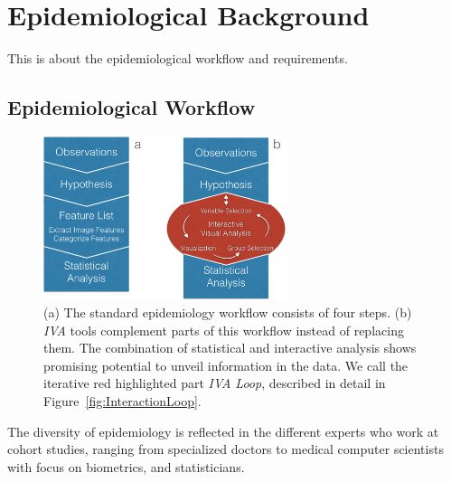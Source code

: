 \documentclass[journal]{style/vgtc} 			          %
\begin{document}
\section{Epidemiological Background} \label{MedicalAndTechnicalBackground}

This is about the epidemiological workflow and requirements.

\subsection{Epidemiological Workflow} \label{EpidemiologicalWorkflow}
\begin{figure}[htb]
 \centering
 \includegraphics[width=2.8in]{figures/workflow_comparison}
 \caption{
 (a) The standard epidemiology workflow consists of four steps.
 (b) \emph{IVA} tools complement parts of this workflow instead of replacing them.
 The combination of statistical and interactive analysis shows promising potential to unveil information in the data.
 We call the iterative red highlighted part \emph{IVA Loop}, described in detail in Figure~\ref{fig:InteractionLoop}.
 }
  \label{fig:WorkflowComparison}
\end{figure}
The diversity of epidemiology is reflected in the different experts who work at cohort studies, ranging from specialized doctors to medical computer scientists with focus on biometrics, and statisticians.
\end{document}
